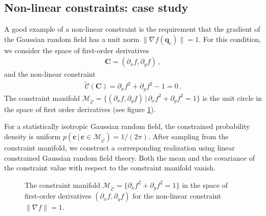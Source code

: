 \documentclass[a4paper, 11pt]{article}
\begin{document}
\bigskip
\subsection{Non-linear constraints: case study}
A good example of a non-linear constraint is the requirement that the gradient of the Gaussian random field has a unit norm $\|\nabla f(\bm{q}_c)\|=1$. For this condition, we consider the space of first-order derivatives
\begin{align}
\bm{C}=(\partial_x f, \partial_y f)\,,
\end{align}
and the non-linear constraint 
\begin{align}
\mathcal{\tilde C}(\bm{C})=\partial_x f^2 +  \partial_y f^2 - 1=0\,.
\end{align}
The constraint manifold $\mathcal{M}_\mathcal{\tilde C}=\{(\partial_xf,\partial_yf)\, |\, \partial_xf^2+\partial_yf^2=1\}$ is the unit circle in the space of first order derivatives (see figure \ref{fig:constraintManifold_example}).

For a statistically isotropic Gaussian random field, the constrained probability density is uniform $p(\bm{c}\, |\, \bm{c}\in\mathcal{M}_\mathcal{\tilde C}) = 1/(2\pi)$. After sampling from the constraint manifold, we construct a corresponding realization using linear constrained Gaussian random field theory. Both the mean and the covariance of the constraint value with respect to the constraint manifold vanish.

\begin{figure}
\centering
\begin{subfigure}[b]{0.49\textwidth}
\end{subfigure}
\caption{The constraint manifold $\mathcal{M}_\mathcal{\tilde C}=\{\partial_xf^2+\partial_yf^2=1\}$ in the space of first-order derivatives $(\partial_x f,\partial_yf)$ for the non-linear constraint $\|\nabla f\|=1$.}\label{fig:constraintManifold_example}
\end{figure}
\end{document}
